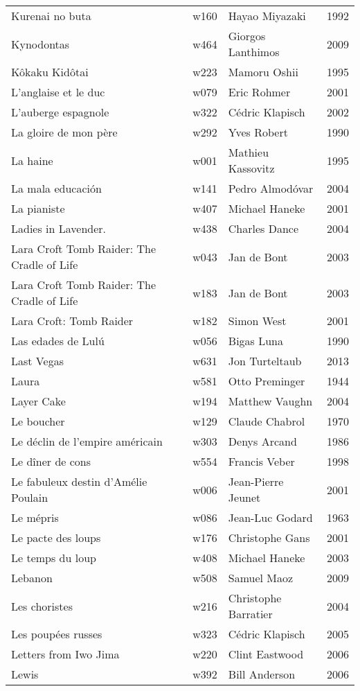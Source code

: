 \documentclass{article}
\begin{document}
\begin {center}
\begin{longtable}{p{10cm} l l l}
Kurenai no buta & w160 & Hayao Miyazaki & 1992 \\
Kynodontas & w464 & Giorgos Lanthimos & 2009 \\
Kôkaku Kidôtai & w223 & Mamoru Oshii & 1995 \\
L'anglaise et le duc & w079 & Eric Rohmer & 2001 \\
L'auberge espagnole & w322 & Cédric Klapisch & 2002 \\
La gloire de mon père & w292 & Yves Robert & 1990 \\
La haine & w001 & Mathieu Kassovitz & 1995 \\
La mala educación & w141 & Pedro Almodóvar & 2004 \\
La pianiste & w407 & Michael Haneke & 2001 \\
Ladies in Lavender. & w438 & Charles Dance & 2004 \\
Lara Croft Tomb Raider: The Cradle of Life & w043 & Jan de Bont & 2003 \\
Lara Croft Tomb Raider: The Cradle of Life & w183 & Jan de Bont & 2003 \\
Lara Croft: Tomb Raider & w182 & Simon West & 2001 \\
Las edades de Lulú & w056 & Bigas Luna & 1990 \\
Last Vegas & w631 & Jon Turteltaub & 2013 \\
Laura & w581 & Otto Preminger & 1944 \\
Layer Cake & w194 & Matthew Vaughn & 2004 \\
Le boucher & w129 & Claude Chabrol & 1970 \\
Le déclin de l'empire américain & w303 & Denys Arcand & 1986 \\
Le dîner de cons & w554 & Francis Veber & 1998 \\
Le fabuleux destin d'Amélie Poulain & w006 & Jean-Pierre Jeunet & 2001 \\
Le mépris & w086 & Jean-Luc Godard & 1963 \\
Le pacte des loups & w176 & Christophe Gans & 2001 \\
Le temps du loup & w408 & Michael Haneke & 2003 \\
Lebanon & w508 & Samuel Maoz & 2009 \\
Les choristes & w216 & Christophe Barratier & 2004 \\
Les poupées russes & w323 & Cédric Klapisch & 2005 \\
Letters from Iwo Jima & w220 & Clint Eastwood & 2006 \\
Lewis & w392 & Bill Anderson & 2006 \\

\end{longtable}
\end{center}
\end{document}
